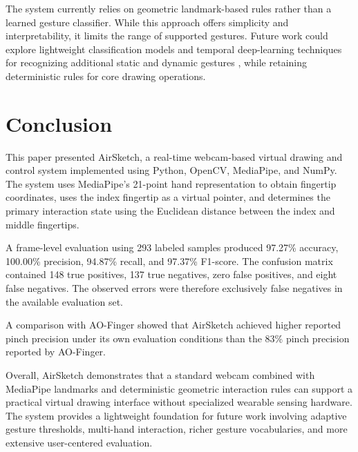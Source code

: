 \documentclass[conference]{IEEEtran}
\begin{document}
The system currently relies on geometric landmark-based rules rather than a learned gesture classifier. While this approach offers simplicity and interpretability, it limits the range of supported gestures. Future work could explore lightweight classification models and temporal deep-learning techniques for recognizing additional static and dynamic gestures \cite{moreira2026,anithadevi2025}, while retaining deterministic rules for core drawing operations.


\section{Conclusion}

This paper presented AirSketch, a real-time webcam-based virtual drawing and control system implemented using Python, OpenCV, MediaPipe, and NumPy. The system uses MediaPipe's 21-point hand representation to obtain fingertip coordinates, uses the index fingertip as a virtual pointer, and determines the primary interaction state using the Euclidean distance between the index and middle fingertips.

A frame-level evaluation using 293 labeled samples produced 97.27\% accuracy, 100.00\% precision, 94.87\% recall, and 97.37\% F1-score. The confusion matrix contained 148 true positives, 137 true negatives, zero false positives, and eight false negatives. The observed errors were therefore exclusively false negatives in the available evaluation set.

A comparison with AO-Finger showed that AirSketch achieved higher reported pinch precision under its own evaluation conditions than the 83\% pinch precision reported by AO-Finger.

Overall, AirSketch demonstrates that a standard webcam combined with MediaPipe landmarks and deterministic geometric interaction rules can support a practical virtual drawing interface without specialized wearable sensing hardware. The system provides a lightweight foundation for future work involving adaptive gesture thresholds, multi-hand interaction, richer gesture vocabularies, and more extensive user-centered evaluation.
\end{document}
